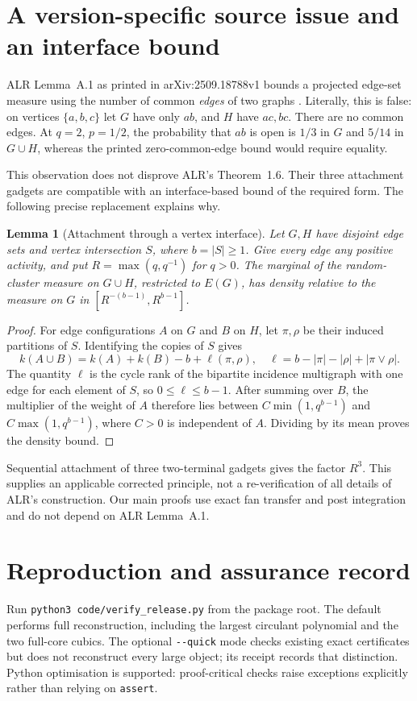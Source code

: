 \documentclass[11pt,a4paper]{article}
\newtheorem{lemma}[theorem]{Lemma}
\theoremstyle{remark}\newtheorem{remark}[theorem]{Remark}
\begin{document}
\section{A version-specific source issue and an interface bound}\label{app:source}
ALR Lemma~A.1 as printed in arXiv:2509.18788v1 bounds a projected edge-set measure using the number of common \emph{edges} of two graphs \cite[p.~30]{ALR}. Literally, this is false: on vertices $\{a,b,c\}$ let $G$ have only $ab$, and $H$ have $ac,bc$. There are no common edges. At $q=2$, $p=1/2$, the probability that $ab$ is open is $1/3$ in $G$ and $5/14$ in $G\cup H$, whereas the printed zero-common-edge bound would require equality.

This observation does not disprove ALR's Theorem~1.6. Their three attachment gadgets are compatible with an interface-based bound of the required form. The following precise replacement explains why.
\begin{lemma}[Attachment through a vertex interface]\label{lem:interface}
Let $G,H$ have disjoint edge sets and vertex intersection $S$, where $b=|S|\ge1$. Give every edge any positive activity, and put $R=\max(q,q^{-1})$ for $q>0$. The marginal of the random-cluster measure on $G\cup H$, restricted to $E(G)$, has density relative to the measure on $G$ in
$[R^{-(b-1)},R^{b-1}]$.
\end{lemma}
\begin{proof}
For edge configurations $A$ on $G$ and $B$ on $H$, let $\pi,\rho$ be their induced partitions of $S$. Identifying the copies of $S$ gives
\[
k(A\cup B)=k(A)+k(B)-b+\ell(\pi,\rho),\quad
\ell=b-|\pi|-|\rho|+|\pi\vee\rho|.
\]
The quantity $\ell$ is the cycle rank of the bipartite incidence multigraph with one edge for each element of $S$, so $0\le\ell\le b-1$. After summing over $B$, the multiplier of the weight of $A$ therefore lies between $C\min(1,q^{b-1})$ and $C\max(1,q^{b-1})$, where $C>0$ is independent of $A$. Dividing by its mean proves the density bound.
\end{proof}
Sequential attachment of three two-terminal gadgets gives the factor $R^3$. This supplies an applicable corrected principle, not a re-verification of all details of ALR's construction. Our main proofs use exact fan transfer and post integration and do not depend on ALR Lemma~A.1.

\section{Reproduction and assurance record}
Run \texttt{python3 code/verify\_release.py} from the package root. The default performs full reconstruction, including the largest circulant polynomial and the two full-core cubics. The optional \texttt{-{}-quick} mode checks existing exact certificates but does not reconstruct every large object; its receipt records that distinction. Python optimisation is supported: proof-critical checks raise exceptions explicitly rather than relying on \texttt{assert}.
\end{document}
